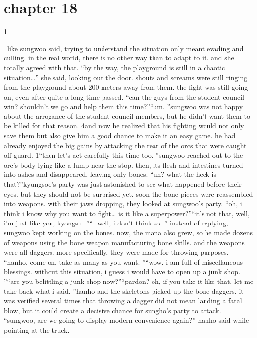 \section{chapter 18}

                            1




 like sungwoo said, trying to understand the situation only meant evading and culling.
 in the real world, there is no other way than to adapt to it.
 and she totally agreed with that.
“by the way, the playground is still in a chaotic situation…” she said, looking out the door.
shouts and screams were still ringing from the playground about 200 meters away from them.
the fight was still going on, even after quite a long time passed.
“can the guys from the student council win? shouldn’t we go and help them this time?”“um.
”sungwoo was not happy about the arrogance of the student council members, but he didn’t want them to be killed for that reason.
4and now he realized that his fighting would not only save them but also give him a good chance to make it an easy game.
 he had already enjoyed the big gains by attacking the rear of the orcs that were caught off guard.
1“then let’s act carefully this time too.
”sungwoo reached out to the orc’s body lying like a lump near the stop.
 then, its flesh and intestines turned into ashes and disappeared, leaving only bones.
“uh? what the heck is that?”kyungsoo’s party was just astonished to see what happened before their eyes.
 but they should not be surprised yet.
soon the bone pieces were reassembled into weapons.
 with their jaws dropping, they looked at sungwoo’s party.
“oh, i think i know why you want to fight… is it like a superpower?”“it’s not that, well, i’m just like you, kyongsu.
”“…well, i don’t think so.
”
instead of replying, sungwoo kept working on the bones.
 now, the mana also grew, so he made dozens of weapons using the bone weapon manufacturing bone skills.
and the weapons were all daggers.
 more specifically, they were made for throwing purposes.
“hanho, come on, take as many as you want.
”“wow.
 i am full of miscellaneous blessings.
 without this situation, i guess i would have to open up a junk shop.
”“are you belittling a junk shop now?”“pardon? oh, if you take it like that, let me take back what i said.
”hanho and the skeletons picked up the bone daggers.
 it was verified several times that throwing a dagger did not mean landing a fatal blow, but it could create a decisive chance for sungho’s party to attack.
“sungwoo, are we going to display modern convenience again?” hanho said while pointing at the truck.
